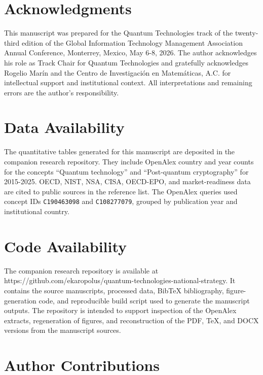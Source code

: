 \documentclass[
  11pt,
  letterpaper,
]{article}
\begin{document}
\section{Acknowledgments}\label{acknowledgments}

This manuscript was prepared for the Quantum Technologies track of the
twenty-third edition of the Global Information Technology Management
Association Annual Conference, Monterrey, Mexico, May 6-8, 2026. The
author acknowledges his role as Track Chair for Quantum Technologies and
gratefully acknowledges Rogelio Marín and the Centro de Investigación en
Matemáticas, A.C. for intellectual support and institutional context.
All interpretations and remaining errors are the author's
responsibility.

\section{Data Availability}\label{data-availability}

The quantitative tables generated for this manuscript are deposited in
the companion research repository. They include OpenAlex country and
year counts for the concepts ``Quantum technology'' and ``Post-quantum
cryptography'' for 2015-2025. OECD, NIST, NSA, CISA, OECD-EPO, and
market-readiness data are cited to public sources in the reference list.
The OpenAlex queries used concept IDs \texttt{C190463098} and
\texttt{C108277079}, grouped by publication year and institutional
country.

\section{Code Availability}\label{code-availability}

The companion research repository is available at
https://github.com/ekaropolus/quantum-technologies-national-strategy. It
contains the source manuscripts, processed data, BibTeX bibliography,
figure-generation code, and reproducible build script used to generate
the manuscript outputs. The repository is intended to support inspection
of the OpenAlex extracts, regeneration of figures, and reconstruction of
the PDF, TeX, and DOCX versions from the manuscript sources.

\section{Author Contributions}\label{author-contributions}
\end{document}
